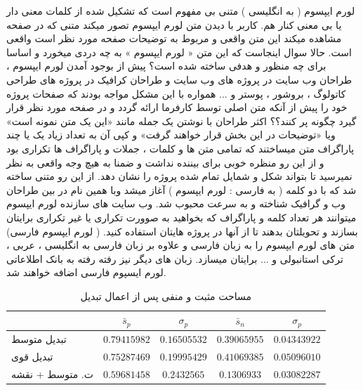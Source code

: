 لورم ایپسوم ( به انگلیسی  ) متنی بی مفهوم است که تشکیل شده از کلمات معنی دار یا بی معنی کنار هم. کاربر با دیدن متن لورم ایپسوم تصور میکند متنی که در صفحه مشاهده میکند این متن واقعی و مربوط به توضیحات صفحه مورد نظر است واقعی است. حالا سوال اینجاست که این متن « لورم ایپسوم » به چه دردی میخورد و اساسا برای چه منظور و هدفی ساخته شده است؟ پیش از بوجود آمدن لورم ایپسوم ، طراحان وب سایت در پروژه های وب سایت و طراحان کرافیک در پروژه های طراحی کاتولوگ ، بروشور ، پوستر و ... همواره با این مشکل مواجه بودند که صفحات پروژه خود را پیش از آنکه متن اصلی توسط کارفرما ارائه گردد و در صفحه مورد نظر قرار گیرد چگونه پر کنند؟؟ اکثر طراحان با نوشتن یک جمله مانند «این یک متن نمونه است» ویا «توضیحات در این بخش قرار خواهند گرفت» و کپی آن به تعداد زیاد یک یا چند پاراگراف متن میساختند که تمامی متن ها و کلمات ، جملات و پاراگراف ها تکراری بود و از این رو منظره خوبی برای بیننده نداشت و ضمنا به هیچ وجه واقعی به نظر نمیرسید تا بتواند شکل و شمایل تمام شده پروژه را نشان دهد. از این رو متنی ساخته شد که با دو کلمه ( به فارسی : لورم ایپسوم ) آغاز میشد وبا همین نام در بین طراحان وب و گرافیک شناخته و به سرعت محبوب شد. وب سایت های سازنده لورم ایپسوم میتوانند هر تعداد کلمه و پاراگراف که بخواهید به صوورت تکراری یا غیر تکراری برایتان بسازند و تحویلتان بدهند تا از آنها در پروژه هایتان استفاده کنید. ( لورم ایپسوم فارسی) متن های لورم ایپسوم را به زبان فارسی و علاوه بر زبان فارسی به انگلیسی ، عربی ، ترکی استانبولی و ... برایتان میسازد. زبان های دیگر نیز رفته رفته به بانک اطلاعاتی لورم ایسپوم فارسی اضافه خواهند شد.  

\begin{table}[h]
\begin{center}
\def\arraystretch{1.5}
\begin{tabularx}{\textwidth}{|X|c|c|c|c|}
\hline
 &
 $\bar{s}_{p}$ & $\sigma_p$ & $\bar{s}_{n}$ & $\sigma_p$ \\
\hline
تبدیل متوسط & 

$0.79415982$ & $0.16505532$	&	$0.39065955$ &	$0.04343922$
 \\ \hline
تبدیل قوی  & 

$0.75287469$ &	$0.19995429$	&	$0.41069385$ & $0.05096010$ \\ 
\hline
 \small{ ت. متوسط + نقشه}
  &   $0.59681458$	& $0.2432565$	& 	$0.1306933$ & $0.03082287$
 \\
\hline
\end{tabularx}
\caption{مساحت مثبت و منفی پس از اعمال تبدیل}
\label{tab:evdtflnosal}
\end{center}
\end{table}

